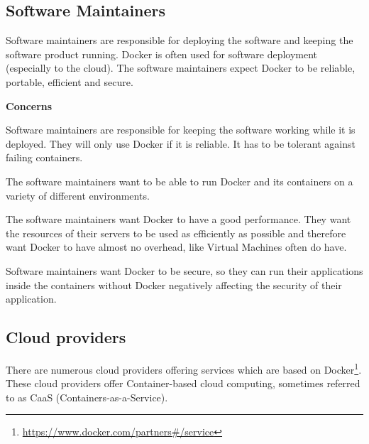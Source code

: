 \subsection*{Software Maintainers}
Software maintainers are responsible for deploying the software and keeping the software product running. Docker is often used for software deployment (especially to the cloud). %
The software maintainers expect Docker to be reliable, portable, efficient and secure.

\textbf{Concerns}
\begin{description}[labelwidth=6cm,labelindent=30pt,style=multiline,leftmargin=5.5cm,font=\normalfont\itshape]


\item[\textbf{Reliability}] Software maintainers are responsible for keeping the software working while it is deployed. They will only use Docker if it is reliable. It has to be tolerant against failing containers.

\item[\textbf{Portability}] The software maintainers want to be able to run Docker and its containers on a variety of different environments.

\item[\textbf{Performance efficiency}] The software maintainers want Docker to have a good performance. They want the resources of their servers to be used as efficiently as possible and therefore want Docker to have almost no overhead, like Virtual Machines often do have.


\item[\textbf{Security}] Software maintainers want Docker to be secure, so they can run their applications inside the containers without Docker negatively affecting the security of their application.


\end{description}



\subsection*{Cloud providers}
There are numerous cloud providers offering services which are based on Docker\footnote{\url{https://www.docker.com/partners\#/service}}. These cloud providers offer Container-based cloud computing, sometimes referred to as CaaS (Containers-as-a-Service).


